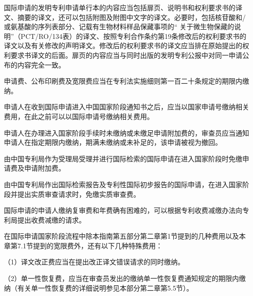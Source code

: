 国际申请的发明专利申请单行本的内容应当包括扉页、说明书和权利要求书的译文、摘要的译文，还可以包括附图及附图中文字的译文。必要时，包括核苷酸和/或氨基酸的序列表部分、记载有生物材料样品保藏事项的“ 关于微生物保藏的说明”（PCT/RO/134表）的译文、按照专利合作条约第19条修改后的权利要求书的译文以及有关修改的声明译文。修改后的权利要求书的译文应当排在原始提出的权利要求书译文的后面。扉页的内容应当与同时出版的发明专利公报中对同一申请公布的内容完全一致。

申请费、公布印刷费及宽限费应当在专利法实施细则第一百二十条规定的期限内缴纳。

申请人在收到国际申请进入中国国家阶段通知书之后，应当以国家申请号缴纳相关费用，在此之前可以以国际申请号缴纳相关费用。

申请人在办理进入国家阶段手续时未缴纳或未缴足申请附加费的，审查员应当通知申请人在指定期限内缴纳，期满未缴纳或未补足的，该申请被视为撤回。

由中国专利局作为受理局受理并进行国际检索的国际申请在进入国家阶段时免缴申请费及申请附加费。

由中国专利局作出国际检索报告及专利性国际初步报告的国际申请，在进入国家阶段并提出实质审查请求时，免缴实质审查费。

国际申请的申请人缴纳复审费和年费确有困难的，可以根据专利收费减缴办法向专利局提出收费减缴的请求。

在国际申请国家阶段流程中除本指南第五部分第二章第1节提到的几种费用以及本章第7.1节提到的宽限费外，还有以下几种特殊费用：

{\setlength{\parindent}{17.8bp}（1）译文改正费应当在提出改正译文错误请求的同时缴纳。\par}

{\setlength{\parindent}{17.8bp}（2）单一性恢复费，应当在审查员发出的缴纳单一性恢复费通知规定的期限内缴纳（有关单一性恢复费的详细说明参见本部分第二章第5.5节）。\par}

{\setlength{\parindent}{17.8bp}\par}

